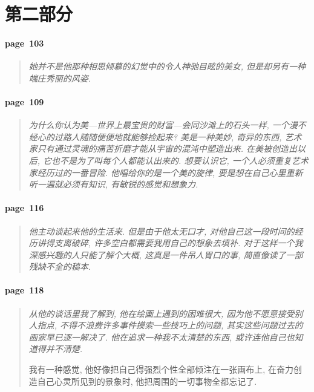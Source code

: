 \section{第二部分}

\paragraph*{page~103}
\begin{quotation}
    \itshape
    她并不是他那种相思倾慕的幻觉中的令人神驰目眩的美女, 但是却另有一种端庄秀丽的风姿. 
\end{quotation}

\paragraph*{page~109}
\begin{quotation}
    \itshape
    为什么你认为美---世界上最宝贵的财富---会同沙滩上的石头一样, 一个漫不经心的过路人随随便便地就能够捡起来? 美是一种美妙, 奇异的东西, 艺术家只有通过灵魂的痛苦折磨才能从宇宙的混沌中塑造出来. 在美被创造出以后, 它也不是为了叫每个人都能认出来的. 想要认识它, 一个人必须重复艺术家经历过的一番冒险. 他唱给你的是一个美的旋律, 要是想在自己心里重新听一遍就必须有知识, 有敏锐的感觉和想象力. 
\end{quotation}

\paragraph*{page~116}
\begin{quotation}
    \itshape
    他主动谈起来他的生活来. 但是由于他太无口才, 对他自己这一段时间的经历讲得支离破碎, 许多空白都需要我用自己的想象去填补. 对于这样一个我深感兴趣的人只能了解个大概, 这真是一件吊人胃口的事, 简直像读了一部残缺不全的稿本. 
\end{quotation}

\paragraph*{page~118}
\begin{quotation}
    \itshape
    从他的谈话里我了解到, 他在绘画上遇到的困难很大, 因为他不愿意接受别人指点, 不得不浪费许多事件摸索一些技巧上的问题, 其实这些问题过去的画家早已逐一解决了. 他在追求一种我不太清楚的东西, 或许连他自己也知道得并不清楚.

    我有一种感觉, 他好像把自己得强烈个性全部倾注在一张画布上, 在奋力创造自己心灵所见到的景象时, 他把周围的一切事物全都忘记了. 
\end{quotation}

